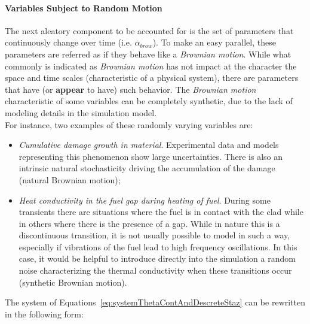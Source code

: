 \paragraph{Variables Subject to Random Motion}
The next aleatory component to be accounted for is the set of parameters that continuously change over time (i.e. $\overline{\alpha}_{brow}$). 
To make an easy parallel,  these parameters are referred as if they behave like a \textit{Brownian motion}. 
While what commonly is indicated as \textit{Brownian motion} has not impact at the character
the space and time scales (characteristic of a physical system), there are parameters that have (or \textbf{appear} 
to have) such behavior. The  \textit{Brownian motion} characteristic of some variables can be completely 
synthetic, due to the lack of modeling details in the simulation model.
\\For instance, two examples of these randomly varying variables are:
\begin{itemize}
  \item \textit{Cumulative damage growth in material}. Experimental data and models representing this
  phenomenon show large uncertainties. There is also an intrinsic natural stochasticity driving
  the accumulation of the damage (natural Brownian motion);
  \item \textit{Heat conductivity in the fuel gap during heating of fuel}. During some transients there are
  situations where the fuel is in contact with the clad while in others where there is the presence of a gap. While in   
  nature this is a discontinuous transition, it is not usually possible to model in such a way, especially if vibrations 
  of the fuel lead to high frequency oscillations. In this case, it would be helpful to introduce directly into the 
  simulation a random noise characterizing the thermal conductivity when these transitions occur (synthetic 
  Brownian motion).
\end{itemize}
The system of Equations~\ref{eq:systemThetaContAndDescreteStaz} can be rewritten in the following form:


